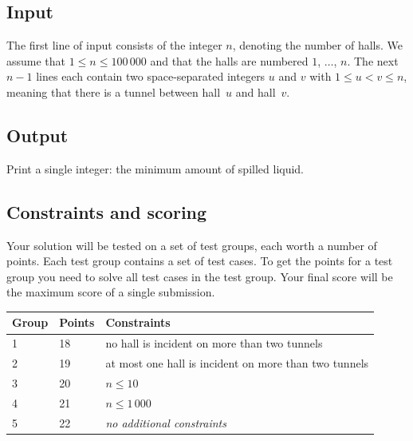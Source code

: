 \subsection*{Input}

The first line of input consists of the integer $n$, denoting the number of halls.
We assume that $1\leq n\leq 100\,000$ and that the halls are numbered $1$, $\ldots$, $n$.
The next $n-1$ lines each contain two space-separated integers $u$ and $v$ with $1\leq u < v \leq n$, meaning that there is a tunnel between hall~$u$ and hall~$v$.

\subsection*{Output}

Print a single integer: the minimum amount of spilled liquid.

\subsection*{Constraints and scoring}

Your solution will be tested on a set of test groups, each worth a number of points.
Each test group contains a set of test cases.
To get the points for a test group you need to solve all test cases in the test group.
Your final score will be the maximum score of a single submission.

\medskip
\begin{tabular}{lll}
Group & Points & Constraints \\\hline
1 & 18 & no hall is incident on more than two tunnels\\
2 & 19 & at most one hall is incident on more than two tunnels\\
3 & 20 & $n\leq 10$\\
4 & 21 & $n\leq 1\,000$\\
5 & 22 & \emph{no additional constraints}
\end{tabular}
